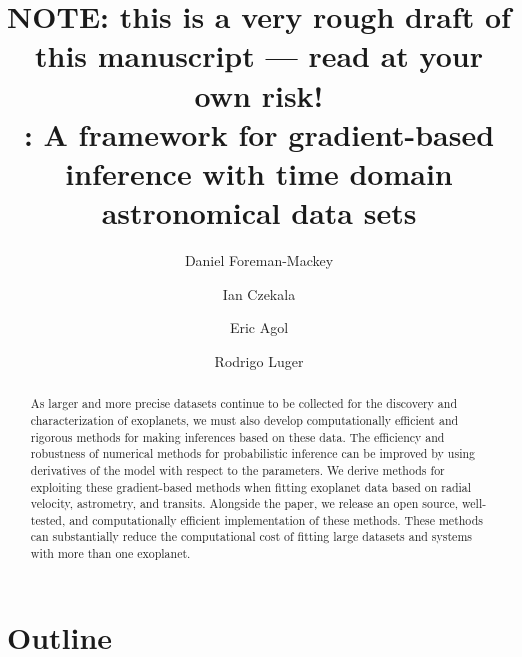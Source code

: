 \documentclass[modern]{aastex62}
\begin{document}
\raggedbottom\sloppy\sloppypar\frenchspacing

\title{%
{\bf NOTE: this is a very rough draft of this manuscript --- read at your own risk!}
\\
\exoplanet: A framework for gradient-based inference with time domain astronomical data sets
}

\author[0000-0002-9328-5652]{Daniel Foreman-Mackey}

\author[0000-0002-1483-8811]{Ian Czekala}

\author[0000-0002-0802-9145]{Eric Agol}

\author[0000-0002-0296-3826]{Rodrigo Luger}

\begin{abstract}
\noindent
As larger and more precise datasets continue to be collected for the discovery and characterization of exoplanets, we must also develop computationally efficient and rigorous methods for making inferences based on these data.
The efficiency and robustness of numerical methods for probabilistic inference
can be improved by using derivatives of the model with respect to the
parameters.
We derive methods for exploiting these gradient-based methods
when fitting exoplanet data based on radial velocity, astrometry, and
transits.
Alongside the paper, we release an open source, well-tested, and
computationally efficient implementation of these methods.
These methods can substantially reduce the computational cost of fitting large
datasets and systems with more than one exoplanet.

\end{abstract}


\section{Outline}
\end{document}
